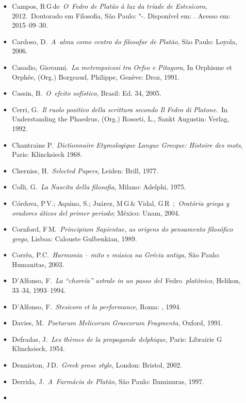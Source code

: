 {\begin{itemize}
  1991.
\item
  Campos, R\,G\,de~\emph{O~Fedro de Platão à luz da tríade de
  Estesícoro}, 2012.~Doutorado em Filosofia, São Paulo: "-.
  Disponível em: . Acesso em: 2015--09--30.
\item
  Cardoso, D.~\emph{A~alma como centro do filosofar de Platão}, São
  Paulo: Loyola, 2006.
\item
  Casadio, Giovanni.~\emph{La metempsicosi tra Orfeo e Pitagora}, In
  Orphisme et Orphée, (Org.) Borgeaud, Philippe, Genève: Droz, 1991.
\item
  Cassin, B.~\emph{O~efeito sofístico}, Brasil: Ed. 34, 2005.
\item
  Cerri, G.~\emph{Il ruolo positivo della scrittura secondo Il Fedro di
  Platone}.~In Understanding the Phaedrus, (Org.) Rosseti, L., Sankt
  Augustin: Verlag, 1992.
\item
  Chantraine P.~\emph{Dictionnaire Etymologique Langue Grecque: Histoire
  des mots}, Paris: Klincksieck 1968.
\item
  Cherniss, H.~\emph{Selected Papers}, Leiden: Brill, 1977.
\item
  Colli, G.~\emph{La Nascita della filosofia}, Milano: Adelphi, 1975.
\item
  Córdova, P\,V.; Aquino, S.; Juárez, M\,G\,\& Vidal, G\,R\,  ;~\emph{Oratória griega y oradores áticos del primer periodo}; México:
  Unam, 2004.
\item
  Cornford, F\,M.~\emph{Principium Sapientae, as origens do pensamento
  filosófico grego}, Lisboa: Calouste Gulbenkian, 1989.
\item
  Corrêa, P.C.~\emph{Harmonia -- mito e música na Grécia antiga}, São
  Paulo: Humanitas, 2003.
\item
  D'Alfonso, F.~\emph{La ``choreía'' astrale in un passo
  del~}Fedro\emph{~platônico}, Helikon, 33--34, 1993--1994.
\item
  D'Alfonso, F.~\emph{Stesicoro et la performance}, Roma: , 1994.
\item
  Davies, M.~\emph{Poetarum Melicorum Graecorum Fragmenta}, Oxford,
  1991.
\item
  Defradas, J.~\emph{Les thèmes de la propagande delphique}, Paris:
  Librairie G\,Klincksieck, 1954.
\item
  Denniston, J\,D.~\emph{Greek prose style}, London: Bristol, 2002.
\item
  Derrida, J.~\emph{A~Farmácia de Platão}, São Paulo: Iluminuras, 1997.
\item

\end{itemize}}
